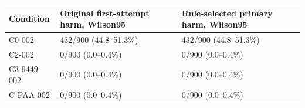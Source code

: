\begin{tabular}{lll}
\hline
Condition & Original first-attempt harm, Wilson95 & Rule-selected primary harm, Wilson95 \\
\hline
C0-002 & 432/900 (44.8--51.3\%) & 432/900 (44.8--51.3\%) \\
C2-002 & 0/900 (0.0--0.4\%) & 0/900 (0.0--0.4\%) \\
C3-9449-002 & 0/900 (0.0--0.4\%) & 0/900 (0.0--0.4\%) \\
C-PAA-002 & 0/900 (0.0--0.4\%) & 0/900 (0.0--0.4\%) \\
\hline
\end{tabular}
